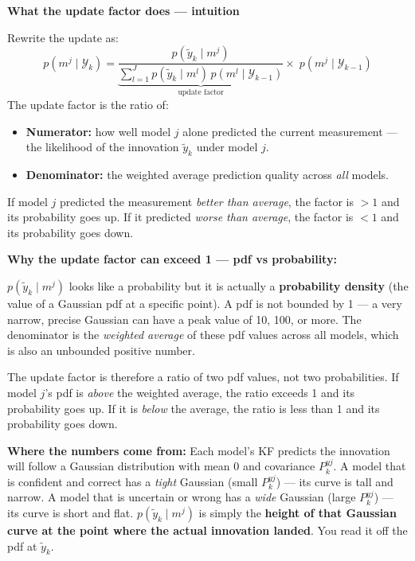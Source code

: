 \documentclass[12pt, a4paper]{article}
\begin{document}
\begin{notebox}
  \textbf{What the update factor does --- intuition}

  Rewrite the update as:
  \[
    p(m^j \mid \mathcal{Y}_k)
    = \underbrace{\frac{p(\tilde{y}_k \mid m^j)}
        {\displaystyle\sum_{l=1}^J
         p(\tilde{y}_k \mid m^l)\,p(m^l \mid \mathcal{Y}_{k-1})}}_{\text{update factor}}
      \times\; p(m^j \mid \mathcal{Y}_{k-1})
  \]
  The update factor is the ratio of:
  \begin{itemize}[leftmargin=1.5em, itemsep=2pt]
    \item \textbf{Numerator:} how well model $j$ alone predicted the
      current measurement --- the likelihood of the innovation
      $\tilde{y}_k$ under model $j$.
    \item \textbf{Denominator:} the weighted average prediction quality
      across \emph{all} models.
  \end{itemize}
  If model $j$ predicted the measurement \emph{better than average}, the
  factor is $> 1$ and its probability goes up.
  If it predicted \emph{worse than average}, the factor is $< 1$ and its
  probability goes down.

  \textbf{Why the update factor can exceed 1 --- pdf vs probability:}

  $p(\tilde{y}_k \mid m^j)$ looks like a probability but it is actually
  a \textbf{probability density} (the value of a Gaussian pdf at a
  specific point).
  A pdf is not bounded by 1 --- a very narrow, precise Gaussian can have
  a peak value of 10, 100, or more.
  The denominator is the \emph{weighted average} of these pdf values
  across all models, which is also an unbounded positive number.

  The update factor is therefore a ratio of two pdf values, not two
  probabilities.
  If model $j$'s pdf is \emph{above} the weighted average, the ratio
  exceeds 1 and its probability goes up.
  If it is \emph{below} the average, the ratio is less than 1 and its
  probability goes down.

  \textbf{Where the numbers come from:}
  Each model's KF predicts the innovation will follow a Gaussian
  distribution with mean 0 and covariance $P_k^{yj}$.
  A model that is confident and correct has a \emph{tight} Gaussian
  (small $P_k^{yj}$) --- its curve is tall and narrow.
  A model that is uncertain or wrong has a \emph{wide} Gaussian (large
  $P_k^{yj}$) --- its curve is short and flat.
  $p(\tilde{y}_k \mid m^j)$ is simply the \textbf{height of that
  Gaussian curve at the point where the actual innovation landed}.
  You read it off the pdf at $\tilde{y}_k$.


\end{notebox}
\end{document}

